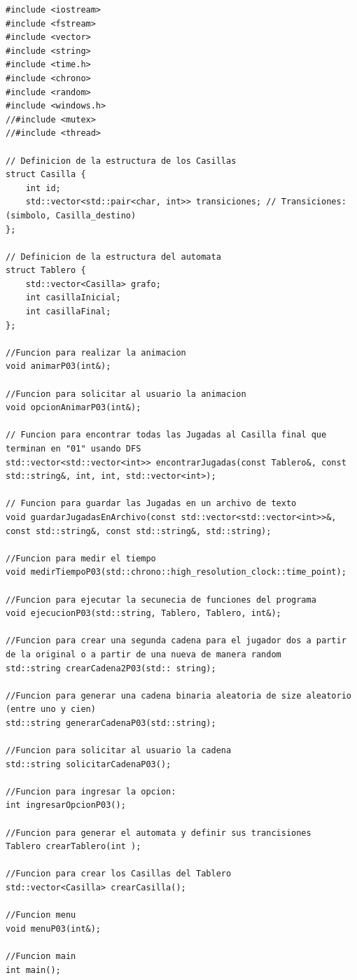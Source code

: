 \documentclass{article}
\begin{document}
            \begin{lstlisting}[caption={Archivo: \textit{PRACTICA03.h}}, style=cppstyle, basicstyle=\ttfamily\footnotesize]
#include <iostream>
#include <fstream>
#include <vector>
#include <string>
#include <time.h>
#include <chrono>
#include <random>
#include <windows.h>
//#include <mutex>
//#include <thread>

// Definicion de la estructura de los Casillas
struct Casilla {
    int id;
    std::vector<std::pair<char, int>> transiciones; // Transiciones: (simbolo, Casilla_destino)
};

// Definicion de la estructura del automata
struct Tablero {
    std::vector<Casilla> grafo;
    int casillaInicial;
    int casillaFinal;
};

//Funcion para realizar la animacion
void animarP03(int&);

//Funcion para solicitar al usuario la animacion
void opcionAnimarP03(int&);

// Funcion para encontrar todas las Jugadas al Casilla final que terminan en "01" usando DFS
std::vector<std::vector<int>> encontrarJugadas(const Tablero&, const std::string&, int, int, std::vector<int>);

// Funcion para guardar las Jugadas en un archivo de texto
void guardarJugadasEnArchivo(const std::vector<std::vector<int>>&, const std::string&, const std::string&, std::string);

//Funcion para medir el tiempo
void medirTiempoP03(std::chrono::high_resolution_clock::time_point);

//Funcion para ejecutar la secunecia de funciones del programa
void ejecucionP03(std::string, Tablero, Tablero, int&);

//Funcion para crear una segunda cadena para el jugador dos a partir de la original o a partir de una nueva de manera random
std::string crearCadena2P03(std:: string);

//Funcion para generar una cadena binaria aleatoria de size aleatorio (entre uno y cien)
std::string generarCadenaP03(std::string);

//Funcion para solicitar al usuario la cadena
std::string solicitarCadenaP03();

//Funcion para ingresar la opcion:
int ingresarOpcionP03();

//Funcion para generar el automata y definir sus trancisiones
Tablero crearTablero(int );

//Funcion para crear los Casillas del Tablero
std::vector<Casilla> crearCasilla();

//Funcion menu
void menuP03(int&);

//Funcion main
int main();
            \end{lstlisting}
\end{document}
